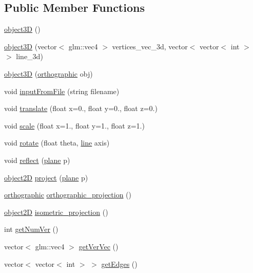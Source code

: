 \subsection*{Public Member Functions}
\begin{DoxyCompactItemize}
\item 
\mbox{\hyperlink{classobject3D_a0911667d0108c1ae15a60a3e120a2a73}{object3D}} ()
\item 
\mbox{\hyperlink{classobject3D_a1c60c123d02bd02d9ca35fd507fb81cd}{object3D}} (vector$<$ glm\+::vec4 $>$ vertices\+\_\+vec\+\_\+3d, vector$<$ vector$<$ int $>$ $>$ line\+\_\+3d)
\item 
\mbox{\hyperlink{classobject3D_a6837b926d352b2fd1aff01bed902f1bf}{object3D}} (\mbox{\hyperlink{classorthographic}{orthographic}} obj)
\item 
void \mbox{\hyperlink{classobject3D_ab9f47d0de463217dd4cc816d16bf1661}{input\+From\+File}} (string filename)
\item 
void \mbox{\hyperlink{classobject3D_a78772ee3fafc1ad79168776baef859fa}{translate}} (float x=0., float y=0., float z=0.)
\item 
void \mbox{\hyperlink{classobject3D_ab12153ab6a9092e85db7912670d55a48}{scale}} (float x=1., float y=1., float z=1.)
\item 
void \mbox{\hyperlink{classobject3D_a9599c3e6c9ea35b9496d4b5b14623b5b}{rotate}} (float theta, \mbox{\hyperlink{classline}{line}} axis)
\item 
void \mbox{\hyperlink{classobject3D_a63af641d18acc59e4ff0cae8387b06bc}{reflect}} (\mbox{\hyperlink{classplane}{plane}} p)
\item 
\mbox{\hyperlink{classobject2D}{object2D}} \mbox{\hyperlink{classobject3D_a4b7bdf9d5a609b34e1ca22490538a37d}{project}} (\mbox{\hyperlink{classplane}{plane}} p)
\item 
\mbox{\hyperlink{classorthographic}{orthographic}} \mbox{\hyperlink{classobject3D_a7bb948cdf51a8143338bb8a22e97f910}{orthographic\+\_\+projection}} ()
\item 
\mbox{\hyperlink{classobject2D}{object2D}} \mbox{\hyperlink{classobject3D_a18f7b37e4d847917835205c9faf0885e}{isometric\+\_\+projection}} ()
\item 
int \mbox{\hyperlink{classobject3D_aeb34ac3e26a3c7a8190f2abadfaa370a}{get\+Num\+Ver}} ()
\item 
vector$<$ glm\+::vec4 $>$ \mbox{\hyperlink{classobject3D_a9b0407c5b8444f840d3bebaf3deac07f}{get\+Ver\+Vec}} ()
\item 
vector$<$ vector$<$ int $>$ $>$ \mbox{\hyperlink{classobject3D_a4ed285050b7a9def183cbba66766934d}{get\+Edges}} ()
\end{DoxyCompactItemize}


